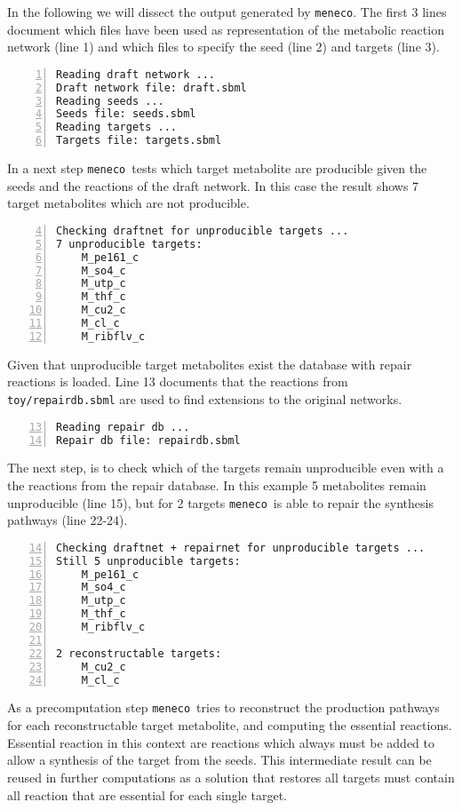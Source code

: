 \documentclass{article}
\newcommand\meneco{\texttt{meneco}}
\begin{document}
In the following we will dissect the output generated by \meneco.
The first 3 lines document which files have been used as representation of the metabolic reaction network (line 1)
and which files to specify the seed (line 2) and targets (line 3).
\begin{Verbatim}[frame=single,numbers=left]
Reading draft network ...
Draft network file: draft.sbml
Reading seeds ...
Seeds file: seeds.sbml
Reading targets ...
Targets file: targets.sbml
\end{Verbatim}
In a next step \meneco\ tests which target metabolite are producible given the seeds and the reactions of the draft network.
In this case the result shows 7 target metabolites which are not producible.
\begin{Verbatim}[frame=single,numbers=left,firstnumber=4]
Checking draftnet for unproducible targets ...
7 unproducible targets:
    M_pe161_c
    M_so4_c
    M_utp_c
    M_thf_c
    M_cu2_c
    M_cl_c
    M_ribflv_c
\end{Verbatim}
Given that unproducible target metabolites exist the database with repair reactions is loaded.
Line 13 documents that the reactions from \verb|toy/repairdb.sbml| are used to find extensions to the original networks.
\begin{Verbatim}[frame=single,numbers=left,firstnumber=13]
Reading repair db ...
Repair db file: repairdb.sbml

\end{Verbatim}
The next step, is to check which of the targets remain unproducible even with a the reactions from the repair database.
In this example 5 metabolites remain unproducible (line 15),
but for 2 targets \meneco\ is able to repair the synthesis pathways (line 22-24).
\begin{Verbatim}[frame=single,numbers=left,firstnumber=14]
Checking draftnet + repairnet for unproducible targets ...
Still 5 unproducible targets:
    M_pe161_c
    M_so4_c
    M_utp_c
    M_thf_c
    M_ribflv_c

2 reconstructable targets:
    M_cu2_c
    M_cl_c
\end{Verbatim}
As a precomputation step \meneco\ tries to reconstruct the production pathways for each reconstructable target metabolite,
and computing the essential reactions.
Essential reaction in this context are reactions which always must be added to allow a synthesis of the target from the seeds.
This intermediate result can be reused in further computations as a solution that restores all targets must contain all reaction that are essential for each single target.
\end{document}
